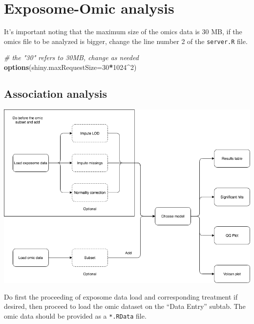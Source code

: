 \documentclass[
]{book}
\newenvironment{Shaded}{\begin{snugshade}}{\end{snugshade}}
\newcommand{\CommentTok}[1]{\textcolor[rgb]{0.56,0.35,0.01}{\textit{#1}}}
\newcommand{\DataTypeTok}[1]{\textcolor[rgb]{0.13,0.29,0.53}{#1}}
\newcommand{\DecValTok}[1]{\textcolor[rgb]{0.00,0.00,0.81}{#1}}
\newcommand{\KeywordTok}[1]{\textcolor[rgb]{0.13,0.29,0.53}{\textbf{#1}}}
\newcommand{\NormalTok}[1]{#1}
\newcommand{\OperatorTok}[1]{\textcolor[rgb]{0.81,0.36,0.00}{\textbf{#1}}}
\begin{document}
\hypertarget{exposome-omic-analysis}{%
\section{Exposome-Omic analysis}\label{exposome-omic-analysis}}

It's important noting that the maximum size of the omics data is 30 MB, if the omics file to be analyzed is bigger, change the line number 2 of the \texttt{server.R} file.

\begin{Shaded}
\begin{Highlighting}[]
  \CommentTok{# the "30" refers to 30MB, change as needed}
\KeywordTok{options}\NormalTok{(}\DataTypeTok{shiny.maxRequestSize=}\DecValTok{30}\OperatorTok{*}\DecValTok{1024}\OperatorTok{^}\DecValTok{2}\NormalTok{)}
\end{Highlighting}
\end{Shaded}

\hypertarget{association-analysis}{%
\subsection{Association analysis}\label{association-analysis}}

\includegraphics{images/analysis9_1.png}

Do first the proceeding of exposome data load and corresponding treatment if desired, then proceed to load the omic dataset on the ``Data Entry'' subtab. The omic data should be provided as a \texttt{*.RData} file.
\end{document}
